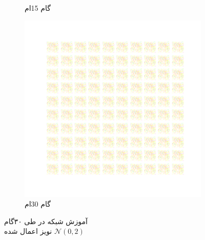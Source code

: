 \documentclass[12pt, a4paper]{book}
\begin{document}
\begin{figure}[h]
\begin{subfigure}{0.3\linewidth}
        \caption{گام 15ام}
    \end{subfigure}
    \begin{subfigure}{0.3\linewidth}
        \includegraphics[width=\linewidth]{images/fcgan/noisy_std2.0/generated_img_30.png}
        \caption{گام 30ام}
    \end{subfigure}
    \caption{آموزش شبکه  در طی ۳۰گام\\ نویز اعمال شده $\mathcal{N}(0,2)$}
    \label{fcgan_noisy_std2.0}
\end{figure}
\end{document}
